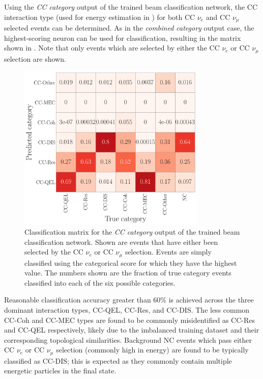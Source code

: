 Using the \emph{CC category} output of the trained beam classification network, the CC interaction
type (used for energy estimation in ) for both CC $\nu_{e}$
and CC $\nu_{\mu}$ selected events can be determined. As in the \emph{combined category} output
case, the highest-scoring neuron can be used for classification, resulting in the matrix shown in
. Note that only events which are selected by either the CC
$\nu_{e}$ or CC $\nu_{\mu}$ selection are shown.

\begin{figure} %
    \includegraphics[width=0.8\textwidth]{diagrams/7-results/final_cc_cat_confusion.pdf}
    \caption[Classification matrix for the CC category output of the beam classification network]
    {Classification matrix for the \emph{CC category} output of the trained beam classification
        network. Shown are events that have either been selected by the CC $\nu_{e}$ or CC
        $\nu_{\mu}$ selection. Events are simply classified using the categorical score for which
        they have the highest value. The numbers shown are the fraction of true category events
        classified into each of the six possible categories.}
    \label{fig:final_cc_cat_confusion}
\end{figure}

Reasonable classification accuracy greater than 60\% is achieved across the three dominant
interaction types, CC-QEL, CC-Res, and CC-DIS. The less common CC-Coh and CC-MEC types are found
to be commonly misidentified as CC-Res and CC-QEL respectively, likely due to the imbalanced
training dataset and their corresponding topological similarities. Background NC events which pass
either CC $\nu_{e}$ or CC $\nu_{\mu}$ selection (commonly high in energy) are found to be
typically classified as CC-DIS; this is expected as they commonly contain multiple energetic
particles in the final state.


